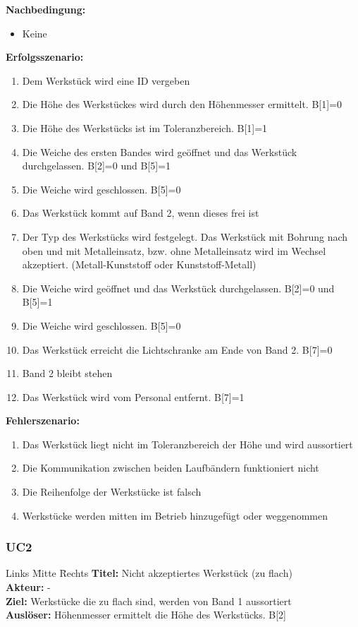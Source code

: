 \documentclass[oneside,a4paper,titlepage]{scrartcl}              %
\begin{document}
\textbf{Nachbedingung:}
\begin{itemize}
  \item Keine
\end{itemize}

\textbf{Erfolgsszenario:}
\begin{enumerate}
  \item Dem Werkstück wird eine ID vergeben
  \item Die Höhe des Werkstückes wird durch den Höhenmesser ermittelt. B[1]=0
  \item Die Höhe des Werkstücks ist im Toleranzbereich. B[1]=1
  \item Die Weiche des ersten Bandes wird geöffnet und das Werkstück durchgelassen.\newline
        B[2]=0 und B[5]=1
  \item Die Weiche wird geschlossen. B[5]=0
  \item Das Werkstück kommt auf Band 2, wenn dieses frei ist
  \item Der Typ des Werkstücks wird festgelegt. Das Werkstück mit Bohrung nach oben und mit Metalleinsatz, bzw. ohne Metalleinsatz wird im Wechsel akzeptiert.\newline
        (Metall-Kunststoff oder Kunststoff-Metall)
  \item Die Weiche wird geöffnet und das Werkstück durchgelassen. B[2]=0 und B[5]=1
  \item Die Weiche wird geschlossen. B[5]=0
  \item Das Werkstück erreicht die Lichtschranke am Ende von Band 2. B[7]=0
  \item Band 2 bleibt stehen
  \item Das Werkstück wird vom Personal entfernt. B[7]=1
\end{enumerate}

\textbf{Fehlerszenario:}
\begin{enumerate}
  \item Das Werkstück liegt nicht im Toleranzbereich der Höhe und wird aussortiert
  \item Die Kommunikation zwischen beiden Laufbändern funktioniert nicht
  \item Die Reihenfolge der Werkstücke ist falsch
  \item Werkstücke werden mitten im Betrieb hinzugefügt oder weggenommen
\end{enumerate}

\subsubsection{UC2}
\begin{tabbing}
  Links \= Mitte \= Rechts \kill
  \textbf{Titel:}    \> \> Nicht akzeptiertes Werkstück (zu flach)\\
  \textbf{Akteur:}   \> \> -\\
  \textbf{Ziel:}     \> \> Werkstücke die zu flach sind, werden von Band 1 aussortiert\\
  \textbf{Auslöser:} \> \> Höhenmesser ermittelt die Höhe des Werkstücks. B[2]\\
\end{tabbing}
\end{document}
